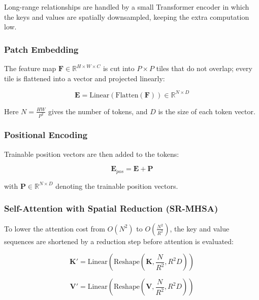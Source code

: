 \documentclass[default, iicol]{sn-jnl}
\theoremstyle{thmstyleone}%
\theoremstyle{thmstyletwo}%
\theoremstyle{thmstylethree}%
\begin{document}
Long-range relationships are handled by a small Transformer encoder in which the keys and values are spatially downsampled, keeping the extra computation low.

\subsubsection{Patch Embedding}

The feature map $\mathbf{F} \in \mathbb{R}^{H \times W \times C}$ is cut into $P \times P$ tiles that do not overlap; every tile is flattened into a vector and projected linearly:

\begin{equation}
\mathbf{E} = \text{Linear}(\text{Flatten}(\mathbf{F})) \in \mathbb{R}^{N \times D}
\label{eq:patch_embed}
\end{equation}

Here $N = \frac{HW}{P^2}$ gives the number of tokens, and $D$ is the size of each token vector.

\subsubsection{Positional Encoding}

Trainable position vectors are then added to the tokens:

\begin{equation}
\mathbf{E}_{pos} = \mathbf{E} + \mathbf{P}
\label{eq:pos_embed}
\end{equation}

with $\mathbf{P} \in \mathbb{R}^{N \times D}$ denoting the trainable position vectors.

\subsubsection{Self-Attention with Spatial Reduction (SR-MHSA)}

To lower the attention cost from $O(N^2)$ to $O(\frac{N^2}{R^2})$, the key and value sequences are shortened by a reduction step before attention is evaluated:

\begin{equation}
\mathbf{K}' = \text{Linear}(\text{Reshape}(\mathbf{K}, \frac{N}{R^2}, R^2D))
\label{eq:sr_key}
\end{equation}

\begin{equation}
\mathbf{V}' = \text{Linear}(\text{Reshape}(\mathbf{V}, \frac{N}{R^2}, R^2D))
\label{eq:sr_value}
\end{equation}
\end{document}
